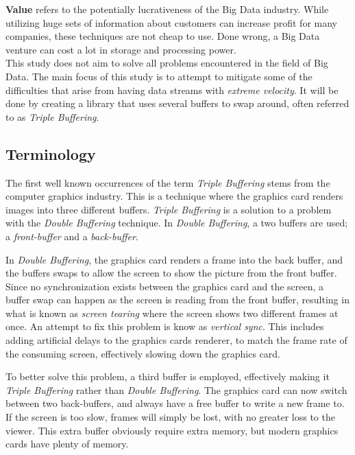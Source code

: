 \documentclass[a4paper]{article}
\begin{document}
\textbf{Value} refers to the potentially lucrativeness of the Big Data industry. While utilizing huge sets of information about customers can increase profit for many companies, these techniques are not cheap to use. Done wrong, a Big Data venture can cost a lot in storage and processing power.\\


This study does not aim to solve all problems encountered in the field of Big Data. The main focus of this study is to attempt to mitigate some of the difficulties that arise from having data streams with \textit{extreme velocity}. It will be done by creating a  library that uses several buffers to swap around, often referred to as \textit{Triple Buffering}.


\subsection{Terminology}
The first well known occurrences of the term \textit{Triple Buffering} stems from the computer graphics industry\cite{3buf}. This is a technique where the graphics card renders images into three different buffers. \textit{Triple Buffering} is a solution to a problem with the \textit{Double Buffering} technique. In \textit{Double Buffering}, a two buffers are used; a \textit{front-buffer} and a \textit{back-buffer}. 

In \textit{Double Buffering}, the graphics card renders a frame into the back buffer, and the buffers swaps to allow the screen to show the picture from the front buffer. Since no synchronization exists between the graphics card and the screen, a buffer swap can happen as the screen is reading from the front buffer, resulting in what is known as \textit{screen tearing} where the screen shows two different frames at once. An attempt to fix this problem is know as \textit{vertical sync}. This includes adding artificial delays to the graphics cards renderer, to match the frame rate of the consuming screen, effectively slowing down the graphics card.

To better solve this problem, a third buffer is employed, effectively making it \textit{Triple Buffering} rather than \textit{Double Buffering}. The graphics card can now switch between two back-buffers, and always have a free buffer to write a new frame to. If the screen is too slow, frames will simply be lost, with no greater loss to the viewer. This extra buffer obviously require extra memory, but modern graphics cards have plenty of memory.\\
\end{document}

